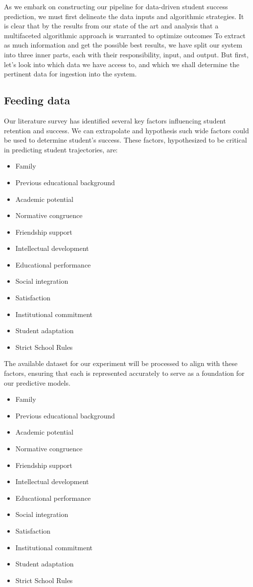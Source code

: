 \documentclass[../main.tex]{subfiles}
\begin{document}
As we embark on constructing our pipeline for data-driven student success prediction, we must first delineate the data inputs and algorithmic strategies. 
It is clear that by the results from our state of the art and analysis that a multifaceted algorithmic approach is warranted to optimize outcomes
To extract as much information and get the possible best results, we have split our system into three inner parts, each with their responsibility, input, and output.
But first, let's look into which data we have access to, and which we shall determine the pertinent data for ingestion into the system.

\subsection{Feeding data}
\label{subsec:conceptualimplementation_feedingdata}
Our literature survey has identified several key factors influencing student retention and success. We can extrapolate and hypothesis such wide factors could be used to determine student's success.
These factors, hypothesized to be critical in predicting student trajectories, are:

\begin{itemize}
    \item Family
    \item Previous educational background
    \item Academic potential
    \item Normative congruence
    \item Friendship support
    \item Intellectual development
    \item Educational performance
    \item Social integration
    \item Satisfaction
    \item Institutional commitment
    \item Student adaptation
    \item Strict School Rules
\end{itemize}

The available dataset for our experiment will be processed to align with these factors, ensuring that each is represented accurately to serve as a foundation for our predictive models.
\begin{itemize}
    \item Family
    \item Previous educational background
    \item Academic potential
    \item Normative congruence
    \item Friendship support
    \item Intellectual development
    \item Educational performance
    \item Social integration
    \item Satisfaction
    \item Institutional commitment
    \item Student adaptation
    \item Strict School Rules
\end{itemize}
\end{document}
